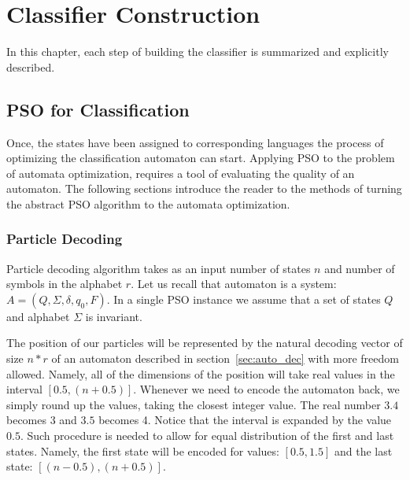 \documentclass{mini}
\begin{document}


\chapter{Classifier Construction}\label{chap:classification}

In this chapter, each step of building the classifier is summarized and explicitly described.

\section{PSO for Classification}

Once, the states have been assigned to corresponding languages the process of optimizing the classification automaton can start. Applying PSO to the problem of automata optimization, requires a tool of evaluating the quality of an automaton. The following sections introduce the reader to the methods of turning the abstract PSO algorithm to the  automata optimization.

\subsection{Particle Decoding}


Particle decoding algorithm takes as an input number of states $n$ and number of symbols in the alphabet $r$.
Let us recall that automaton is a system: $A = (Q, \Sigma, \delta, q_0, F)$. In a single PSO instance we assume that a set of states $Q$ and alphabet $\Sigma$ is invariant. 

The position of our particles will be represented by the natural decoding vector of size $n*r$ of an automaton described in section~\ref{sec:auto_dec} with more freedom allowed. Namely, all of the dimensions of the position will take real values in the interval $[0.5, (n+0.5)]$. Whenever we need to encode the automaton back, we simply round up the values, taking the closest integer value. The real number $3.4$ becomes $3$ and $3.5$ becomes 4. Notice that the interval is expanded by the value $0.5$. Such procedure is needed to allow for equal distribution of the first and last states. Namely, the first state will be encoded for values: $[0.5, 1.5]$ and the last state: $[(n-0.5), (n+0.5)]$.
\end{document}
